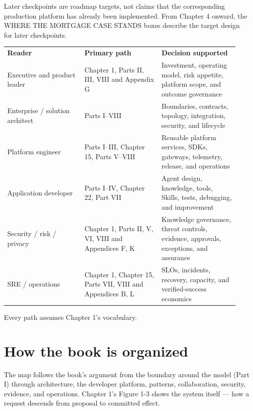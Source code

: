 Later checkpoints are roadmap targets, not claims that the corresponding production platform has already been implemented. From Chapter 4 onward, the WHERE THE MORTGAGE CASE STANDS boxes describe the target design for later checkpoints.\par

\BookTableStart
\small
\begin{tabular}{@{}Y{0.3133\linewidth}Y{0.3133\linewidth}Y{0.3133\linewidth}@{}}
\color{white}\bfseries \textbf{Reader} & \color{white}\bfseries \textbf{Primary path} & \color{white}\bfseries \textbf{Decision supported} \\
Executive and product leader & Chapter 1, Parts II, III, VIII and Appendix G & Investment, operating model, risk appetite, platform scope, and outcome governance \\
Enterprise / solution architect & Parts I–VIII & Boundaries, contracts, topology, integration, security, and lifecycle \\
Platform engineer & Parts I–III, Chapter 15, Parts V–VIII & Reusable platform services, SDKs, gateways, telemetry, release, and operations \\
Application developer & Parts I–IV, Chapter 22, Part VII & Agent design, knowledge, tools, Skills, tests, debugging, and improvement \\
Security / risk / privacy & Chapter 1, Parts II, V, VI, VIII and Appendices F, K & Knowledge governance, threat controls, evidence, approvals, exceptions, and assurance \\
SRE / operations & Chapter 1, Chapter 15, Parts VII, VIII and Appendices B, L & SLOs, incidents, recovery, capacity, and verified-success economics \\
\end{tabular}
\BookTableEnd

Every path assumes Chapter 1's vocabulary.\par

\section{How the book is organized}

The map follows the book's argument from the boundary around the model (Part I) through architecture, the developer platform, patterns, collaboration, security, evidence, and operations. Chapter 1's Figure 1-3 shows the system itself — how a request descends from proposal to committed effect.\par

